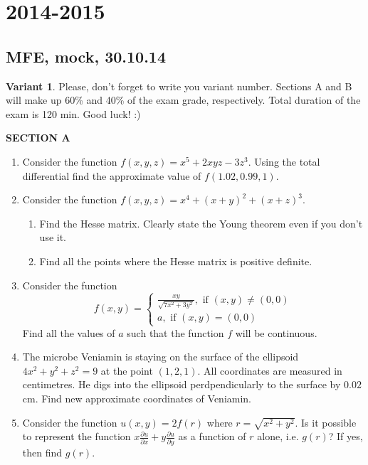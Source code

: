 \documentclass[12pt]{article} %
\theoremstyle{definition} %
\begin{document}
\section{2014-2015}

\subsection{MFE, mock, 30.10.14}

\textbf{Variant 1}. Please, don't forget to write you variant number. Sections A and B will make up 60\% and 40\% of the exam grade, respectively. Total duration of the exam is 120 min. Good luck! :)

\textbf{SECTION A}

\begin{enumerate}

\item Consider the function $f(x,y,z)=x^5+2xyz-3z^3$. Using the total differential find the approximate value of $f(1.02,0.99,1)$.

\item Consider the function $f(x,y,z)=x^4+(x+y)^2+(x+z)^3$.
\begin{enumerate}
\item Find the Hesse matrix. Clearly state the Young theorem even if you don't use it.
\item Find all the points where the Hesse matrix is positive definite.
\end{enumerate}

\item Consider the function
\begin{equation} \nonumber
f(x,y)=
\begin{cases}
	\frac{xy}{\sqrt{7x^2+3y^2}}, \text{ if } (x,y)\neq (0,0) \\
	a, \text{ if } (x,y)=(0,0)
\end{cases}
\end{equation}
Find all the values of $a$ such that the function $f$ will be continuous.


\item The microbe Veniamin is staying on the surface of the ellipsoid $4x^2+y^2+z^2=9$ at the point $(1,2,1)$. All coordinates are measured in centimetres. He digs into the ellipsoid perdpendicularly to the surface by $0.02$ cm. Find new approximate coordinates of Veniamin.

\item Consider the function $u(x,y)=2f(r)$ where $r=\sqrt{x^2+y^2}$. Is it possible to represent the function $x\frac{\partial u}{\partial x}+y\frac{\partial u}{\partial y}$ as a function of $r$ alone, i.e. $g(r)$? If yes, then find $g(r)$.


\end{enumerate}
\end{document}
